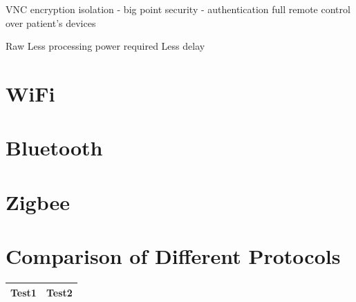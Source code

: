 VNC
encryption
isolation - big point
security - authentication
full remote control over patient's devices 

Raw 
Less processing power required
Less delay

\section{WiFi}

\section{Bluetooth}

\section{Zigbee}

\section{Comparison of Different Protocols}

\begin{center}
	\begin{tabular}{| l | l |}
		\hline
		Test1 & Test2 \\ \hline
	\end{tabular}
\end{center}

